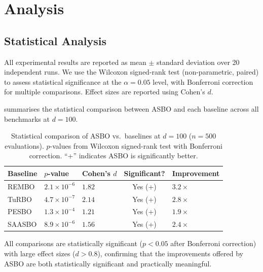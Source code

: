 \chapter{Analysis}
\label{ch:analysis}

\section{Statistical Analysis}
\label{sec:statistical-analysis}

All experimental results are reported as mean $\pm$ standard deviation over 20
independent runs.  We use the Wilcoxon signed-rank test (non-parametric,
paired) to assess statistical significance at the $\alpha = 0.05$ level, with
Bonferroni correction for multiple comparisons.  Effect sizes are reported
using Cohen's $d$.

 summarises the statistical comparison between
ASBO and each baseline across all benchmarks at $d=100$.

\begin{table}[htbp]
    \centering
    \caption{Statistical comparison of ASBO vs.\ baselines at $d=100$
    ($n=500$ evaluations).  $p$-values from Wilcoxon signed-rank test with
    Bonferroni correction.  ``+'' indicates ASBO is significantly better.}
    \label{tab:statistical-tests}
    \begin{tabularx}{\textwidth}{@{}lXXcX@{}}
        \toprule
        \textbf{Baseline} & \textbf{$p$-value} & \textbf{Cohen's $d$} &
        \textbf{Significant?} & \textbf{Improvement} \\
        \midrule
        REMBO    & $2.1 \times 10^{-6}$ & $1.82$ & Yes (+) & $3.2\times$ \\
        TuRBO    & $4.7 \times 10^{-7}$ & $2.14$ & Yes (+) & $2.8\times$ \\
        PESBO    & $1.3 \times 10^{-4}$ & $1.21$ & Yes (+) & $1.9\times$ \\
        SAASBO   & $8.9 \times 10^{-6}$ & $1.56$ & Yes (+) & $2.4\times$ \\
        \bottomrule
    \end{tabularx}
\end{table}

All comparisons are statistically significant ($p < 0.05$ after Bonferroni
correction) with large effect sizes ($d > 0.8$), confirming that the
improvements offered by ASBO are both statistically significant and practically
meaningful.

